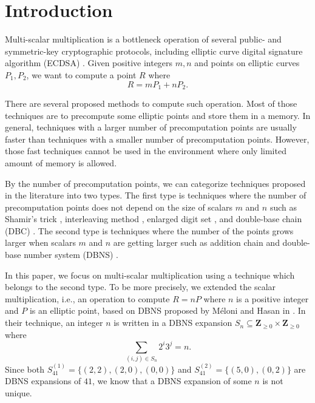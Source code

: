 \section{Introduction}

Multi-scalar multiplication is a bottleneck operation of several public- and symmetric-key cryptographic protocols,
including elliptic curve digital signature algorithm (ECDSA) \cite{ECDSA}.
Given positive integers $m, n$ and points on elliptic curves $P_1, P_2$,
we want to compute a point $R$ where
$$R = m P_1 + n P_2.$$

There are several proposed methods to compute such operation.
Most of those techniques are to precompute some elliptic points  and store them in a memory.
In general, techniques with a larger number of precomputation points are usually faster than techniques with a smaller number of precomputation points.
However, those fast techniques cannot be used in the environment where only limited amount of memory is allowed.

By the number of precomputation points, we can categorize techniques proposed in the literature into two types.
The first type is techniques where the number of precomputation points does not depend on the size of scalars $m$ and $n$ such as Shamir’s trick \cite{Shamir},
interleaving method \cite{interleaving}, enlarged digit set \cite{enlarged2,enlarged4,enlarged1,enlarged3}, and double-base chain (DBC) \cite{dbc2,dbc3,dbc1}.
The second type is techniques where the number of the points grows larger when scalars $m$ and $n$ are getting larger such as addition chain \cite{additionChain1,additionChain2}
and double-base number system (DBNS)  \cite{dbns}.

In this paper, we focus on multi-scalar multiplication using a technique which belongs to the second type.
To be more precisely, we extended the scalar multiplication, i.e., an operation to compute $R = nP$ where $n$ is a positive integer and $P$ is an elliptic point, 
based on DBNS proposed by M\'eloni and Hasan in \cite{dbns}.
In their technique, an integer $n$ is written in a DBNS expansion $S_n \subseteq \mathbf{Z}_{\geq 0} \times \mathbf{Z}_{\geq 0}$ where
$$\sum_{(i,j) \in S_n} 2^i 3^j = n.$$ 
Since both $S^{(1)}_{41} = \{(2,2), (2,0), (0,0)\}$ and $S^{(2)}_{41} = \{(5,0), (0,2)\}$ are DBNS expansions of $41$, we know that a DBNS expansion of some $n$ is not unique.

